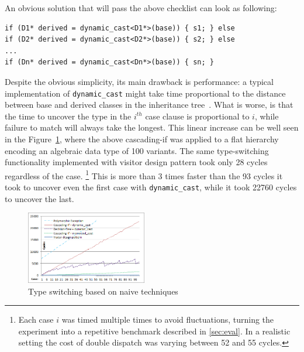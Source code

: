 \documentclass[preprint]{sigplanconf}
\makeatletter
\DeclareRobustCommand{\code}[1]{{\lstinline[breaklines=false,escapechar=@]{#1}}}
\makeatother
\begin{document}
An obvious solution that will pass the above checklist can look as following:

\begin{lstlisting}
if (D1* derived = dynamic_cast<D1*>(base)) { s1; } else
if (D2* derived = dynamic_cast<D2*>(base)) { s2; } else
...
if (Dn* derived = dynamic_cast<Dn*>(base)) { sn; }
\end{lstlisting}

\noindent
Despite the obvious simplicity, its main drawback is performance: a typical 
implementation of \code{dynamic_cast} might take time proportional to the 
distance between base and derived classes in the inheritance tree~\cite{XXXXX}.
What is worse, is that the time to uncover the type in the $i^{th}$ case clause 
is proportional to $i$, while failure to match will always take the longest. 
This linear increase can be well seen in the Figure~\ref{fig:DCastVis1}, where 
the above cascading-if was applied to a flat hierarchy encoding an algebraic 
data type of 100 variants. The same type-switching functionality implemented 
with visitor design pattern took only 28 cycles regardless of the case.
\footnote{Each case $i$ was timed multiple times to avoid fluctuations, turning 
the experiment into a repetitive benchmark described in 
\textsection\ref{sec:eval}. In a realistic setting the cost of double dispatch 
was varying between 52 and 55 cycles.}
This is more than 3 times faster than the 93 cycles it took to uncover even the 
first case with \code{dynamic_cast}, while it took 22760 cycles to uncover the 
last.

\begin{figure}[htbp]
  \centering
    \includegraphics[width=0.47\textwidth]{DCast-vs-Visitors1.png}
  \caption{Type switching based on naive techniques}
  \label{fig:DCastVis1}
\end{figure}
\end{document}
